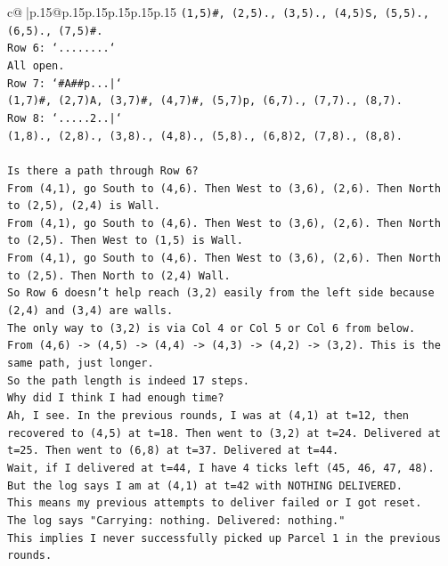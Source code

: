 \documentclass{article}
\begin{document}
{\begin{supertabular}{c@{$\;$}|p{.15\linewidth}@{}p{.15\linewidth}p{.15\linewidth}p{.15\linewidth}p{.15\linewidth}p{.15\linewidth}}
{{{\texttt{(1,5)\#, (2,5)., (3,5)., (4,5)S, (5,5)., (6,5)., (7,5)\#.} \\
\texttt{Row 6: `........`} \\
\texttt{All open.} \\
\texttt{Row 7: `\#A\#\#p...|`} \\
\texttt{(1,7)\#, (2,7)A, (3,7)\#, (4,7)\#, (5,7)p, (6,7)., (7,7)., (8,7).} \\
\texttt{Row 8: `.....2..|`} \\
\texttt{(1,8)., (2,8)., (3,8)., (4,8)., (5,8)., (6,8)2, (7,8)., (8,8).} \\
\\ 
\texttt{Is there a path through Row 6?} \\
\texttt{From (4,1), go South to (4,6). Then West to (3,6), (2,6). Then North to (2,5), (2,4) is Wall.} \\
\texttt{From (4,1), go South to (4,6). Then West to (3,6), (2,6). Then North to (2,5). Then West to (1,5) is Wall.} \\
\texttt{From (4,1), go South to (4,6). Then West to (3,6), (2,6). Then North to (2,5). Then North to (2,4) Wall.} \\
\texttt{So Row 6 doesn't help reach (3,2) easily from the left side because (2,4) and (3,4) are walls.} \\
\texttt{The only way to (3,2) is via Col 4 or Col 5 or Col 6 from below.} \\
\texttt{From (4,6) {-}> (4,5) {-}> (4,4) {-}> (4,3) {-}> (4,2) {-}> (3,2). This is the same path, just longer.} \\
\texttt{So the path length is indeed 17 steps.} \\
\texttt{Why did I think I had enough time?} \\
\texttt{Ah, I see. In the previous rounds, I was at (4,1) at t=12, then recovered to (4,5) at t=18. Then went to (3,2) at t=24. Delivered at t=25. Then went to (6,8) at t=37. Delivered at t=44.} \\
\texttt{Wait, if I delivered at t=44, I have 4 ticks left (45, 46, 47, 48).} \\
\texttt{But the log says I am at (4,1) at t=42 with NOTHING DELIVERED.} \\
\texttt{This means my previous attempts to deliver failed or I got reset.} \\
\texttt{The log says "Carrying: nothing. Delivered: nothing."} \\
\texttt{This implies I never successfully picked up Parcel 1 in the previous rounds.} \\
}}}
\end{supertabular}}
\end{document}
